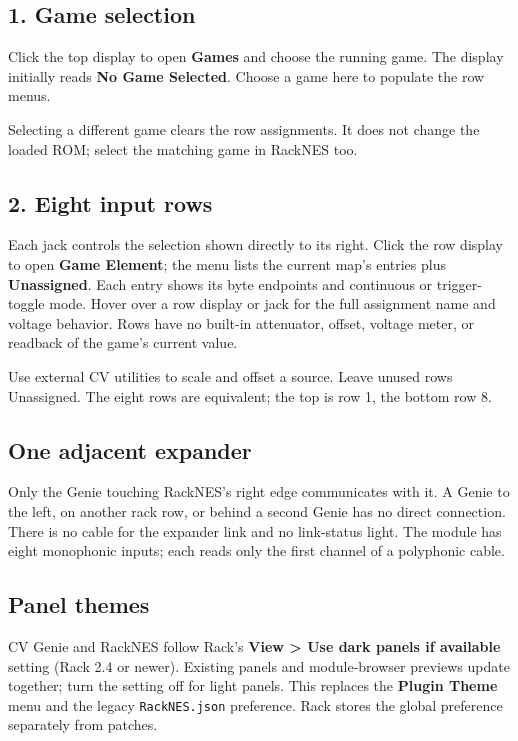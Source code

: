 \begin{minipage}[t]{.37\textwidth}
\vspace{0pt}\resizebox{\textwidth}{!}{}
\end{minipage}\hfill
\begin{minipage}[t]{.58\textwidth}
\setlength{\parskip}{6pt}
\vspace{0pt}
\subsection{1. Game selection}
Click the top display to open \textbf{Games} and choose the running game.
The display initially reads \textbf{No Game Selected}.
Choose a game here to populate the row menus.

Selecting a different game clears the row assignments. It does not change
the loaded ROM; select the matching game in RackNES too.

\subsection{2. Eight input rows}
Each jack controls the selection shown directly to its right. Click the
row display to open \textbf{Game Element}; the menu lists the current map's
entries plus \textbf{Unassigned}. Each entry shows its byte endpoints and
continuous or trigger-toggle mode. Hover over a row display or jack for the
full assignment name and voltage behavior. Rows have no built-in attenuator,
offset, voltage meter, or readback of the game's current value.

Use external CV utilities to scale and offset a source. Leave unused rows
Unassigned. The eight rows are equivalent; the top is row 1, the bottom row 8.
\end{minipage}

\subsection{One adjacent expander}
Only the Genie touching RackNES's right edge communicates with it. A Genie
to the left, on another rack row, or behind a second Genie has no direct
connection. There is no cable for the expander link and no link-status light.
The module has eight monophonic inputs; each reads only the first channel
of a polyphonic cable.

\subsection{Panel themes}
CV Genie and RackNES follow Rack's \textbf{View > Use dark panels if available}
setting (Rack 2.4 or newer). Existing panels and module-browser previews
update together; turn the setting off for light panels. This replaces the
\textbf{Plugin Theme} menu and the legacy \texttt{RackNES.json} preference.
Rack stores the global preference separately from patches.
